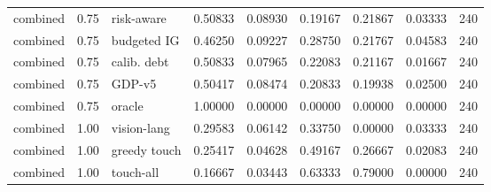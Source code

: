 \documentclass{article}
\begin{document}
\begin{center}
\begin{longtable}{lllllllll}
combined & 0.75 & risk-aware & 0.50833 & 0.08930 & 0.19167 & 0.21867 & 0.03333 & 240 \\
combined & 0.75 & budgeted IG & 0.46250 & 0.09227 & 0.28750 & 0.21767 & 0.04583 & 240 \\
combined & 0.75 & calib. debt & 0.50833 & 0.07965 & 0.22083 & 0.21167 & 0.01667 & 240 \\
combined & 0.75 & GDP-v5 & 0.50417 & 0.08474 & 0.20833 & 0.19938 & 0.02500 & 240 \\
combined & 0.75 & oracle & 1.00000 & 0.00000 & 0.00000 & 0.00000 & 0.00000 & 240 \\
combined & 1.00 & vision-lang & 0.29583 & 0.06142 & 0.33750 & 0.00000 & 0.03333 & 240 \\
combined & 1.00 & greedy touch & 0.25417 & 0.04628 & 0.49167 & 0.26667 & 0.02083 & 240 \\
combined & 1.00 & touch-all & 0.16667 & 0.03443 & 0.63333 & 0.79000 & 0.00000 & 240 \\
\bottomrule
\end{longtable}
\renewcommand{\arraystretch}{1.0}
\end{center}
\end{document}
